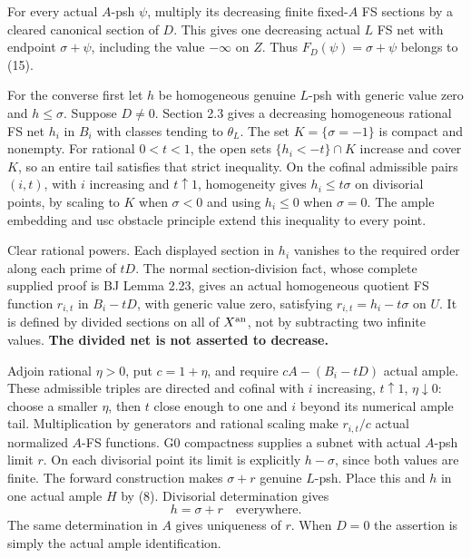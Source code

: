 \documentclass[
  10pt,
]{article}
\begin{document}
For every actual \(A\)-psh \(\psi\), multiply its decreasing finite
fixed-\(A\) FS sections by a cleared canonical section of \(D\). This
gives one decreasing actual \(L\) FS net with endpoint \(\sigma+\psi\),
including the value \(-\infty\) on \(Z\). Thus \(F_D(\psi)=\sigma+\psi\)
belongs to (15).

For the converse first let \(h\) be homogeneous genuine \(L\)-psh with
generic value zero and \(h\leq\sigma\). Suppose \(D\ne0\). Section 2.3
gives a decreasing homogeneous rational FS net \(h_i\) in \(B_i\) with
classes tending to \(\theta_L\). The set \(K=\{\sigma=-1\}\) is compact
and nonempty. For rational \(0<t<1\), the open sets \(\{h_i<-t\}\cap K\)
increase and cover \(K\), so an entire tail satisfies that strict
inequality. On the cofinal admissible pairs \((i,t)\), with \(i\)
increasing and \(t\uparrow1\), homogeneity gives \(h_i\leq t\sigma\) on
divisorial points, by scaling to \(K\) when \(\sigma<0\) and using
\(h_i\leq0\) when \(\sigma=0\). The ample embedding and usc obstacle
principle extend this inequality to every point.

Clear rational powers. Each displayed section in \(h_i\) vanishes to the
required order along each prime of \(tD\). The normal section-division
fact, whose complete supplied proof is BJ Lemma 2.23, gives an actual
homogeneous quotient FS function \(r_{i,t}\) in \(B_i-tD\), with generic
value zero, satisfying \(r_{i,t}=h_i-t\sigma\) on \(U\). It is defined
by divided sections on all of \(X^{\rm an}\), not by subtracting two
infinite values. \textbf{The divided net is not asserted to decrease.}

Adjoin rational \(\eta>0\), put \(c=1+\eta\), and require
\(cA-(B_i-tD)\) actual ample. These admissible triples are directed and
cofinal with \(i\) increasing, \(t\uparrow1\), \(\eta\downarrow0\):
choose a smaller \(\eta\), then \(t\) close enough to one and \(i\)
beyond its numerical ample tail. Multiplication by generators and
rational scaling make \(r_{i,t}/c\) actual normalized \(A\)-FS
functions. G0 compactness supplies a subnet with actual \(A\)-psh limit
\(r\). On each divisorial point its limit is explicitly \(h-\sigma\),
since both values are finite. The forward construction makes
\(\sigma+r\) genuine \(L\)-psh. Place this and \(h\) in one actual ample
\(H\) by (8). Divisorial determination gives
\[h=\sigma+r\quad\text{everywhere}.\tag{16}\] The same determination in
\(A\) gives uniqueness of \(r\). When \(D=0\) the assertion is simply
the actual ample identification.
\end{document}
